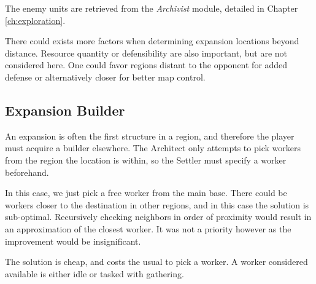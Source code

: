 	The enemy units are retrieved from the \emph{Archivist} module, detailed in Chapter \ref{ch:exploration}.
	
	There could exists more factors when determining expansion locations beyond distance. Resource quantity or defensibility are also important, but are not considered here. One could favor regions distant to the opponent for added defense or alternatively closer for better map control.

	\subsection*{Expansion Builder}
	An expansion is often the first structure in a region, and therefore the player must acquire a builder elsewhere. The Architect only attempts to pick workers from the region the location is within, so the Settler must specify a worker beforehand.
	
	In this case, we just pick a free worker from the main base. There could be workers closer to the destination in other regions, and in this case the solution is sub-optimal. Recursively checking neighbors in order of proximity would result in an approximation of the closest worker. It was not a priority however as the improvement would be insignificant.
	
	The solution is cheap, and costs the usual to pick a worker. A worker considered available is either idle or tasked with gathering.